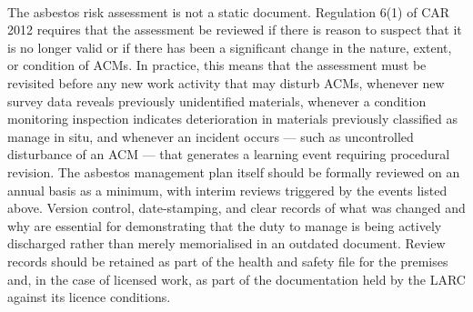 \paragraph{}
The asbestos risk assessment is not a static document. Regulation 6(1) of CAR 2012 requires that the assessment be reviewed if there is reason to suspect that it is no longer valid or if there has been a significant change in the nature, extent, or condition of ACMs. In practice, this means that the assessment must be revisited before any new work activity that may disturb ACMs, whenever new survey data reveals previously unidentified materials, whenever a condition monitoring inspection indicates deterioration in materials previously classified as manage in situ, and whenever an incident occurs — such as uncontrolled disturbance of an ACM — that generates a learning event requiring procedural revision. The asbestos management plan itself should be formally reviewed on an annual basis as a minimum, with interim reviews triggered by the events listed above. Version control, date-stamping, and clear records of what was changed and why are essential for demonstrating that the duty to manage is being actively discharged rather than merely memorialised in an outdated document. Review records should be retained as part of the health and safety file for the premises and, in the case of licensed work, as part of the documentation held by the LARC against its licence conditions.

